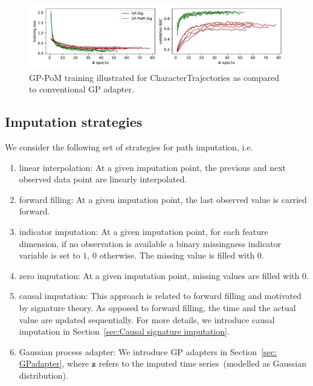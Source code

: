 \documentclass{article}
\begin{document}
\begin{figure}[tbp] 
    \begin{center}
    \includegraphics[width=0.95\linewidth]{plots/gp_training_plot.pdf}\quad%
  \end{center}
  \caption{GP-PoM training illustrated for CharacterTrajectories as compared to conventional GP adapter.}
  \label{supp: gp-training}
\end{figure}



\subsection{Imputation strategies} \label{supp: Imputation}

We consider the following set of strategies for path imputation, i.e.\
\begin{enumerate}
    \item linear interpolation: At a given imputation point, the previous and next observed data point are linearly interpolated.
    \item forward filling: At a given imputation point, the last observed value is carried forward.
    \item indicator imputation: At a given imputation point, for each feature dimension, if no observation is available a binary missingness indicator variable is set to $1$, $0$ otherwise. The missing value is filled with $0$.
    \item zero imputation: At a given imputation point, missing values are filled with $0$.
    \item causal imputation: This approach is related to forward filling
      and motivated by signature theory. As opposed to forward filling,
      the time and the actual value are updated sequentially. For more
      details, we introduce causal imputation in Section~\ref{sec:Causal signature imputation}.
    \item Gaussian process adapter: We introduce GP adapters in
      Section~\ref{sec: GPadapter}, where $\mathbf{z}$
      refers to the imputed time series~(modelled as Gaussian
      distribution).
\end{enumerate}
\end{document}
